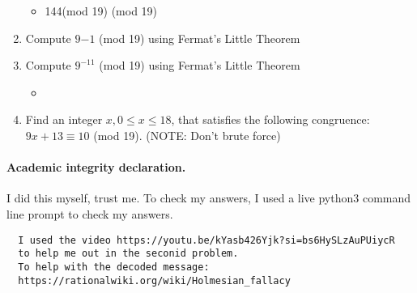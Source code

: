 \documentclass[11pt]{article}
\newcounter{prnum}
\newenvironment{problem}{{\vskip 0.2in\noindent\bf Problem
       \addtocounter{prnum}{1} \arabic{prnum}.}}{\vskip 0.1in}
\begin{document}
\begin{problem}
\begin{enumerate}
\begin{itemize}
        \item 144(mod 19) (mod 19)
      \end{itemize}
    \item Compute $9{-1}$ (mod 19) using Fermat's Little Theorem
    \item Compute $9^{-11}$ (mod 19) using Fermat's Little Theorem
      \begin{itemize}
        \item 
      \end{itemize}
    \item Find an integer $x, 0 \leq x \leq 18$, that satisfies
      the following congruence: $9x + 13 \equiv 10$ (mod 19). (NOTE: Don't brute force)
  \end{enumerate}
\end{problem}


\vskip 0.2in
\paragraph{Academic integrity declaration.}
I did this myself, trust me. To check my answers, I used a live python3 command line prompt to check my answers.
\begin{verbatim}
  I used the video https://youtu.be/kYasb426Yjk?si=bs6HySLzAuPUiycR 
  to help me out in the seconid problem.
  To help with the decoded message:
  https://rationalwiki.org/wiki/Holmesian_fallacy
\end{verbatim}
\end{document}
